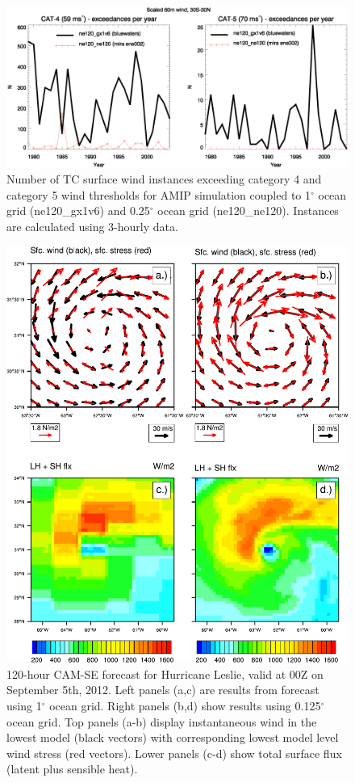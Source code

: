 \documentclass[draft,ms]{AGUTeX}
\newcommand{\degree}{$^{\circ}$}
\begin{document}
\begin{figure}
\includegraphics[width=0.8\linewidth]{fig_Maxwind-exceedance.eps}
\caption{Number of TC surface wind instances exceeding category 4 and category 5 wind thresholds for AMIP simulation coupled to 1\degree{} ocean grid (ne120\_gx1v6) and 0.25\degree{} ocean grid (ne120\_ne120). Instances are calculated using 3-hourly data.}
\label{fig:wind-pdfs}
\end{figure}

\begin{figure}
\includegraphics[width=0.7\linewidth]{fig_compareStress.pdf}
\caption{120-hour CAM-SE forecast for Hurricane Leslie, valid at 00Z on September 5th, 2012. Left panels (a,c) are results from forecast using 1\degree{} ocean grid. Right panels (b,d) show results using 0.125\degree{} ocean grid. Top panels (a-b) display instantaneous wind in the lowest model (black vectors) with corresponding lowest model level wind stress (red vectors). Lower panels (c-d) show total surface flux (latent plus sensible heat).}
\label{fig:forecast_panels}
\end{figure}
\end{document}
